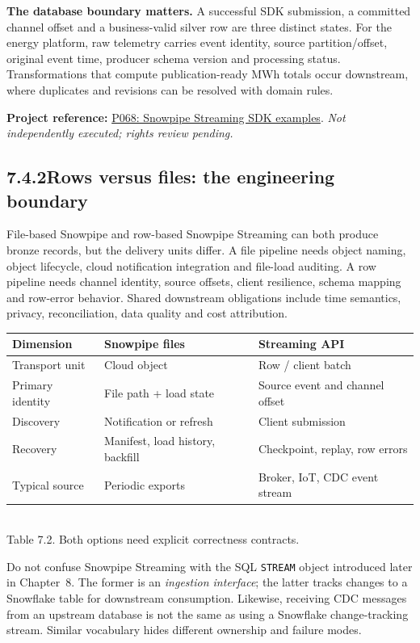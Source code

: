 \documentclass[11pt,twoside]{article}
\newcommand{\topic}[2]{\subsection*{#1\quad #2}}
\newcommand{\repo}[2]{\par\begingroup\fontsize{8.0}{9.6}\selectfont\sffamily\color{inkgray}\textbf{Project reference:} \href{#2}{#1}. \textit{Not independently executed; rights review pending.}\par\endgroup}
\begin{document}
\textbf{The database boundary matters.} A successful SDK submission, a committed channel offset and a business-valid silver row are three distinct states. For the energy platform, raw telemetry carries event identity, source partition/offset, original event time, producer schema version and processing status. Transformations that compute publication-ready MWh totals occur downstream, where duplicates and revisions can be resolved with domain rules.
\repo{P068: Snowpipe Streaming SDK examples}{https://github.com/snowflakedb/snowpipe-streaming-sdk-examples}
\newpage
\topic{7.4.2}{Rows versus files: the engineering boundary}
File-based Snowpipe and row-based Snowpipe Streaming can both produce bronze records, but the delivery units differ. A file pipeline needs object naming, object lifecycle, cloud notification integration and file-load auditing. A row pipeline needs channel identity, source offsets, client resilience, schema mapping and row-error behavior. Shared downstream obligations include time semantics, privacy, reconciliation, data quality and cost attribution.
\begin{center}\renewcommand{\arraystretch}{1.13}\begin{tabularx}{\linewidth}{@{}p{31mm}XX@{}}\toprule
\textbf{Dimension}&\textbf{Snowpipe files}&\textbf{Streaming API}\\\midrule
Transport unit&Cloud object&Row / client batch\\
Primary identity&File path + load state&Source event and channel offset\\
Discovery&Notification or refresh&Client submission\\
Recovery&Manifest, load history, backfill&Checkpoint, replay, row errors\\
Typical source&Periodic exports&Broker, IoT, CDC event stream\\\bottomrule\end{tabularx}\\{\fontsize{8}{9.5}\selectfont\color{inkgray}Table 7.2. Both options need explicit correctness contracts.}\end{center}
Do not confuse Snowpipe Streaming with the SQL \texttt{STREAM} object introduced later in Chapter~8. The former is an \emph{ingestion interface}; the latter tracks changes to a Snowflake table for downstream consumption. Likewise, receiving CDC messages from an upstream database is not the same as using a Snowflake change-tracking stream. Similar vocabulary hides different ownership and failure modes.
\end{document}
